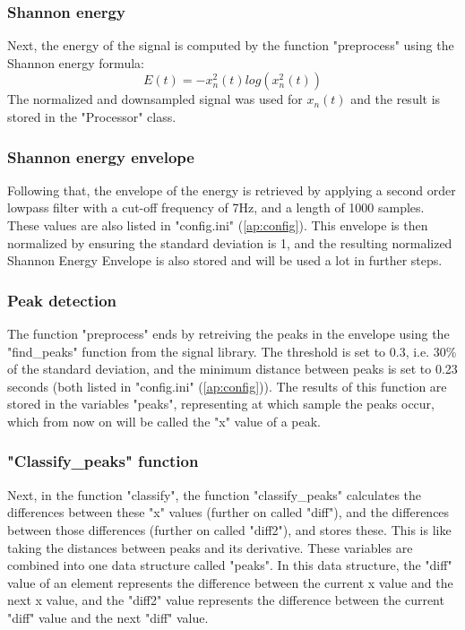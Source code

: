 \subsubsection{Shannon energy}
Next, the energy of the signal is computed by the function "preprocess" using the Shannon energy formula:
\begin{equation}
    \label{eq:shannonenergy}
    E(t) = - x_n^2(t) log(x_n^2(t))
\end{equation}
The normalized and downsampled signal was used for $x_n(t)$ and the result is stored in the "Processor" class.

\subsubsection{Shannon energy envelope}
Following that, the envelope of the energy is retrieved by applying a second order lowpass filter with a cut-off frequency of 7Hz, and a length of 1000 samples. These values are also listed in "config.ini" (\ref{ap:config}). This envelope is then normalized by ensuring the standard deviation is 1, and the resulting normalized Shannon Energy Envelope is also stored and will be used a lot in further steps.

\subsubsection{Peak detection}
The function "preprocess" ends by retreiving the peaks in the envelope using the "find\_peaks" function from the signal library. The threshold is set to 0.3, i.e. 30\% of the standard deviation, and the minimum distance between peaks is set to 0.23 seconds (both listed in "config.ini" (\ref{ap:config})). The results of this function are stored in the variables "peaks", representing at which sample the peaks occur, which from now on will be called the "x" value of a peak.

\subsubsection{"Classify\_peaks" function}
Next, in the function "classify", the function "classify\_peaks" calculates the differences between these "x" values (further on called "diff"), and the differences between those differences (further on called "diff2"), and stores these. This is like taking the distances between peaks and its derivative. These variables are combined into one data structure called "peaks". In this data structure, the "diff" value of an element represents the difference between the current x value and the next x value, and the "diff2" value represents the difference between the current "diff" value and the next "diff" value. 
